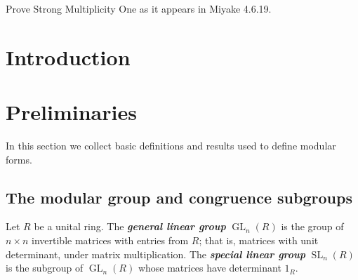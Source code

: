 \documentclass[10pt,leqno]{article}
\newcommand{\textib}[1]{\textbf{\textit{#1}}}
\DeclareMathOperator{\GL}{GL}
\DeclareMathOperator{\SL}{SL}
\begin{document}
Prove Strong Multiplicity One as it appears in Miyake 4.6.19.
\tableofcontents
\newpage

\section{Introduction}

\newpage\section{Preliminaries} In this section we collect basic definitions and results used to define modular forms. %
\subsection{The modular group and congruence subgroups}
Let $R$ be a unital ring. The \textib{general linear group} $\GL_n(R)$ is the group of $n\times n$ invertible matrices with entries from $R$; that is, matrices with unit determinant, under matrix multiplication. The \textib{special linear group} $\SL_n(R)$ is the subgroup of $\GL_n(R)$ whose matrices have determinant $1_R$.
\end{document}
